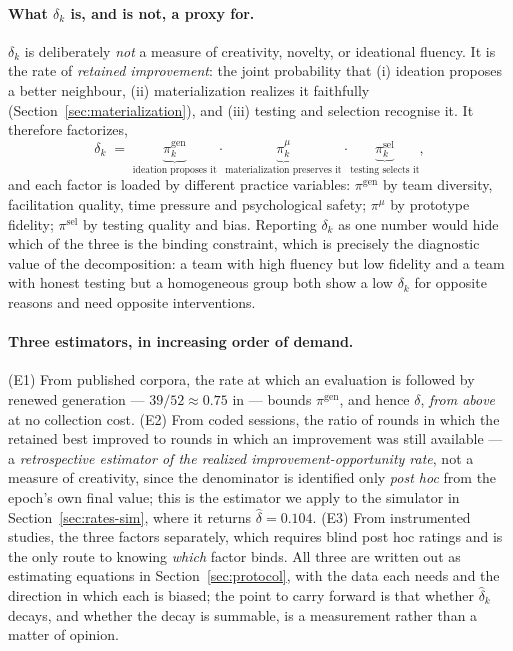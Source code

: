 \documentclass[11pt]{article}
\begin{document}
\paragraph{What $\delta_k$ is, and is not, a proxy for.} $\delta_k$ is deliberately \emph{not} a measure of creativity, novelty, or ideational fluency. It is the rate of \emph{retained improvement}: the joint probability that (i) ideation proposes a better neighbour, (ii) materialization realizes it faithfully (Section~\ref{sec:materialization}), and (iii) testing and selection recognise it. It therefore factorizes,
\begin{equation}
\label{eq:delta-factor}
\delta_k \;=\; \underbrace{\pi^{\text{gen}}_k}_{\text{ideation proposes it}}\cdot
              \underbrace{\pi^{\mu}_k}_{\text{materialization preserves it}}\cdot
              \underbrace{\pi^{\text{sel}}_k}_{\text{testing selects it}},
\end{equation}
and each factor is loaded by different practice variables: $\pi^{\text{gen}}$ by team diversity, facilitation quality, time pressure and psychological safety; $\pi^{\mu}$ by prototype fidelity; $\pi^{\text{sel}}$ by testing quality and bias. Reporting $\delta_k$ as one number would hide which of the three is the binding constraint, which is precisely the diagnostic value of the decomposition: a team with high fluency but low fidelity and a team with honest testing but a homogeneous group both show a low $\delta_k$ for opposite reasons and need opposite interventions.



\paragraph{Three estimators, in increasing order of demand.} (E1) From published corpora, the rate at which an evaluation is followed by renewed generation --- $39/52\approx0.75$ in \citet{sung2019} --- bounds $\pi^{\text{gen}}$, and hence $\delta$, \emph{from above} at no collection cost. (E2) From coded sessions, the ratio of rounds in which the retained best improved to rounds in which an improvement was still available --- a \emph{retrospective estimator of the realized improvement-opportunity rate}, not a measure of creativity, since the denominator is identified only \emph{post hoc} from the epoch's own final value; this is the estimator we apply to the simulator in Section~\ref{sec:rates-sim}, where it returns $\hat\delta=0.104$. (E3) From instrumented studies, the three factors separately, which requires blind post hoc ratings and is the only route to knowing \emph{which} factor binds. All three are written out as estimating equations in Section~\ref{sec:protocol}, with the data each needs and the direction in which each is biased; the point to carry forward is that whether $\hat\delta_k$ decays, and whether the decay is summable, is a measurement rather than a matter of opinion.
\end{document}
